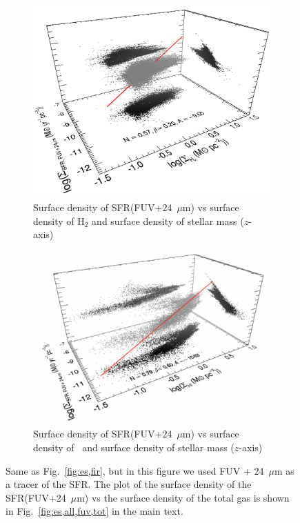 \begin{figure}
    \centering
     \begin{subfigure}[b]{0.5\textwidth}
        \centering
        \includegraphics[width=\textwidth]{../image_paper1/es_tot_fuv_vs_h22_f.png}
        \captionsetup{font=tiny}
        \caption{Surface density of SFR(FUV+24~$\mu$m) vs surface density of H$_2$ and surface density of stellar mass ($z$-axis)}
        \label{fig:es,all,fuv,h2}
    \end{subfigure}
     \hfill
   \begin{subfigure}[b]{0.5\textwidth}
        \centering
        \includegraphics[width=\textwidth]{../image_paper1/es_tot_fuv_vs_hi2.png}
        \captionsetup{font=tiny}
        \caption{Surface density of SFR(FUV+24~$\mu$m) vs surface density of \hi\ and surface density of stellar mass ($z$-axis)}
        \label{fig:es,all,fuv,hi}
    \end{subfigure}
   \caption[Same as Fig.~\ref{fig:es,fir}, but in this figure we used FUV $+$ 24~$\mu$m as a tracer of the SFR]{Same as Fig.~\ref{fig:es,fir}, but in this figure we used FUV $+$ 24~$\mu$m as a tracer of the SFR. The plot of the surface density of the SFR(FUV+24~$\mu$m) vs the surface density of the total gas is shown in Fig.~\ref{fig:es,all,fuv,tot} in the main text.}
\end{figure}

